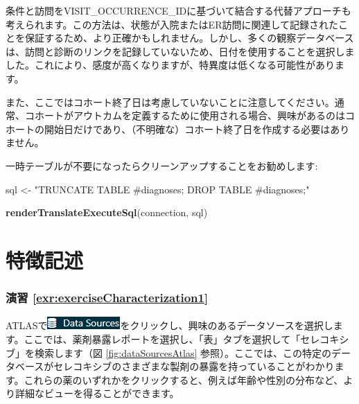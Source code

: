 \documentclass[
  11pt]{book}
\newenvironment{Shaded}{\begin{snugshade}}{\end{snugshade}}
\newcommand{\FunctionTok}[1]{\textcolor[rgb]{0.13,0.29,0.53}{\textbf{#1}}}
\newcommand{\NormalTok}[1]{#1}
\newcommand{\OtherTok}[1]{\textcolor[rgb]{0.56,0.35,0.01}{#1}}
\newcommand{\StringTok}[1]{\textcolor[rgb]{0.31,0.60,0.02}{#1}}
\theoremstyle{definition}
\theoremstyle{definition}
\theoremstyle{definition}
\theoremstyle{definition}
\theoremstyle{remark}
\begin{document}
条件と訪問をVISIT\_OCCURRENCE\_IDに基づいて結合する代替アプローチも考えられます。この方法は、状態が入院またはER訪問に関連して記録されたことを保証するため、より正確かもしれません。しかし、多くの観察データベースは、訪問と診断のリンクを記録していないため、日付を使用することを選択しました。これにより、感度が高くなりますが、特異度は低くなる可能性があります。

また、ここではコホート終了日は考慮していないことに注意してください。通常、コホートがアウトカムを定義するために使用される場合、興味があるのはコホートの開始日だけであり、（不明確な）コホート終了日を作成する必要はありません。

一時テーブルが不要になったらクリーンアップすることをお勧めします:

\begin{Shaded}
\begin{Highlighting}[]
\NormalTok{sql }\OtherTok{\textless{}{-}} \StringTok{"TRUNCATE TABLE \#diagnoses;}
\StringTok{DROP TABLE \#diagnoses;"}

\FunctionTok{renderTranslateExecuteSql}\NormalTok{(connection, sql)}
\end{Highlighting}
\end{Shaded}

\section{特徴記述}\label{Characterizationanswers}

\subsubsection*{演習 \ref{exr:exerciseCharacterization1}}\label{ux6f14ux7fd2-refexrexercisecharacterization1}

ATLASで\includegraphics{images/Characterization/atlasDataSourcesMenuItem.png}をクリックし、興味のあるデータソースを選択します。ここでは、薬剤暴露レポートを選択し、「表」タブを選択して「セレコキシブ」を検索します（図 \ref{fig:dataSourcesAtlas} 参照）。ここでは、この特定のデータベースがセレコキシブのさまざまな製剤の暴露を持っていることがわかります。これらの薬のいずれかをクリックすると、例えば年齢や性別の分布など、より詳細なビューを得ることができます。
\end{document}
